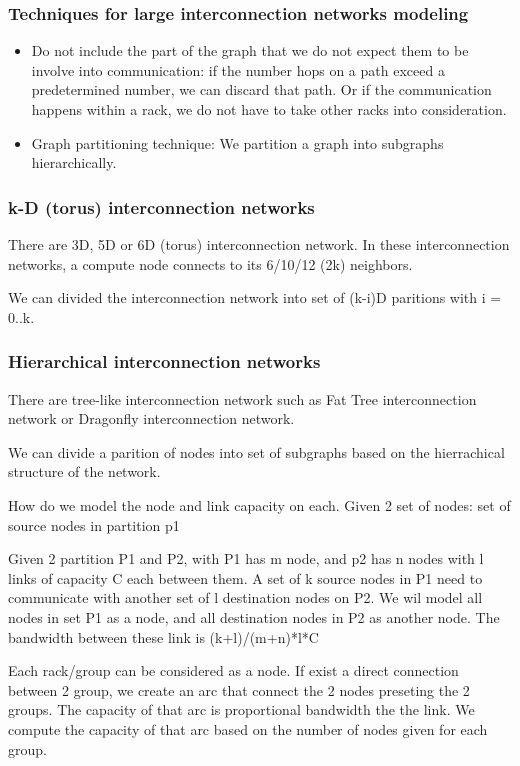 \documentclass[letter]{article}
\begin{document}
\subsubsection{Techniques for large interconnection networks modeling}
\begin{itemize}
\item Do not include the part of the graph that we do not expect them to be involve into communication: if the number hops on a path exceed a predetermined number, we can discard that path. Or if the communication happens within a rack, we do not have to take other racks into consideration.
\item Graph partitioning technique: We partition a graph into subgraphs hierarchically.
\end{itemize}

\subsubsection{k-D (torus) interconnection networks}
There are 3D, 5D or 6D (torus) interconnection network. In these interconnection networks, a compute node connects to its 6/10/12 (2k) neighbors. %

We can divided the interconnection network into set of (k-i)D paritions with i = 0..k.

\subsubsection{Hierarchical interconnection networks}
There are tree-like interconnection network such as Fat Tree interconnection network or Dragonfly interconnection network. 

We can divide a parition of nodes into set of subgraphs based on the hierrachical structure of the network.

How do we model the node and link capacity on each. Given 2 set of nodes: set of source nodes in partition p1

Given 2 partition P1 and P2, with P1 has m node, and p2 has n nodes with l links of capacity C each between them. A set of k source nodes in P1 need to communicate with another set of l destination nodes on P2. We wil model all nodes in set P1 as a node, and all destination nodes in P2 as another node. The bandwidth between these link is (k+l)/(m+n)*l*C

Each rack/group can be considered as a node. If exist a direct connection between 2 group, we create an arc that connect the 2 nodes preseting the 2 groups. The capacity of that arc is proportional bandwidth the the link. We compute the capacity of that arc based on the number of nodes given for each group.
\end{document}
